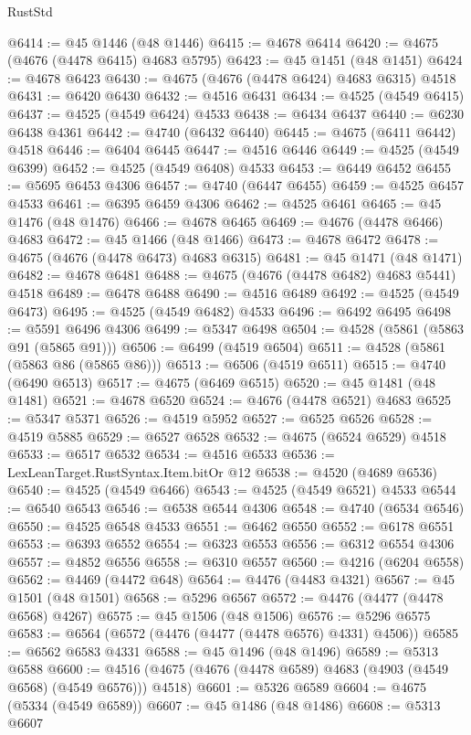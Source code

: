 \begin{lexlean}{RustStd}
\begin{coremodule}
@6414 := @45 @1446 (@48 @1446)
@6415 := @4678 @6414
@6420 := @4675 (@4676 (@4478 @6415) @4683 @5795)
@6423 := @45 @1451 (@48 @1451)
@6424 := @4678 @6423
@6430 := @4675 (@4676 (@4478 @6424) @4683 @6315) @4518
@6431 := @6420 @6430
@6432 := @4516 @6431
@6434 := @4525 (@4549 @6415)
@6437 := @4525 (@4549 @6424) @4533
@6438 := @6434 @6437
@6440 := @6230 @6438 @4361
@6442 := @4740 (@6432 @6440)
@6445 := @4675 (@6411 @6442) @4518
@6446 := @6404 @6445
@6447 := @4516 @6446
@6449 := @4525 (@4549 @6399)
@6452 := @4525 (@4549 @6408) @4533
@6453 := @6449 @6452
@6455 := @5695 @6453 @4306
@6457 := @4740 (@6447 @6455)
@6459 := @4525 @6457 @4533
@6461 := @6395 @6459 @4306
@6462 := @4525 @6461
@6465 := @45 @1476 (@48 @1476)
@6466 := @4678 @6465
@6469 := @4676 (@4478 @6466) @4683
@6472 := @45 @1466 (@48 @1466)
@6473 := @4678 @6472
@6478 := @4675 (@4676 (@4478 @6473) @4683 @6315)
@6481 := @45 @1471 (@48 @1471)
@6482 := @4678 @6481
@6488 := @4675 (@4676 (@4478 @6482) @4683 @5441) @4518
@6489 := @6478 @6488
@6490 := @4516 @6489
@6492 := @4525 (@4549 @6473)
@6495 := @4525 (@4549 @6482) @4533
@6496 := @6492 @6495
@6498 := @5591 @6496 @4306
@6499 := @5347 @6498
@6504 := @4528 (@5861 (@5863 @91 (@5865 @91)))
@6506 := @6499 (@4519 @6504)
@6511 := @4528 (@5861 (@5863 @86 (@5865 @86)))
@6513 := @6506 (@4519 @6511)
@6515 := @4740 (@6490 @6513)
@6517 := @4675 (@6469 @6515)
@6520 := @45 @1481 (@48 @1481)
@6521 := @4678 @6520
@6524 := @4676 (@4478 @6521) @4683
@6525 := @5347 @5371
@6526 := @4519 @5952
@6527 := @6525 @6526
@6528 := @4519 @5885
@6529 := @6527 @6528
@6532 := @4675 (@6524 @6529) @4518
@6533 := @6517 @6532
@6534 := @4516 @6533
@6536 := LexLeanTarget.RustSyntax.Item.bitOr @12
@6538 := @4520 (@4689 @6536)
@6540 := @4525 (@4549 @6466)
@6543 := @4525 (@4549 @6521) @4533
@6544 := @6540 @6543
@6546 := @6538 @6544 @4306
@6548 := @4740 (@6534 @6546)
@6550 := @4525 @6548 @4533
@6551 := @6462 @6550
@6552 := @6178 @6551
@6553 := @6393 @6552
@6554 := @6323 @6553
@6556 := @6312 @6554 @4306
@6557 := @4852 @6556
@6558 := @6310 @6557
@6560 := @4216 (@6204 @6558)
@6562 := @4469 (@4472 @648)
@6564 := @4476 (@4483 @4321)
@6567 := @45 @1501 (@48 @1501)
@6568 := @5296 @6567
@6572 := @4476 (@4477 (@4478 @6568) @4267)
@6575 := @45 @1506 (@48 @1506)
@6576 := @5296 @6575
@6583 := @6564 (@6572 (@4476 (@4477 (@4478 @6576) @4331) @4506))
@6585 := @6562 @6583 @4331
@6588 := @45 @1496 (@48 @1496)
@6589 := @5313 @6588
@6600 := @4516 (@4675 (@4676 (@4478 @6589) @4683 (@4903 (@4549 @6568) (@4549 @6576))) @4518)
@6601 := @5326 @6589
@6604 := @4675 (@5334 (@4549 @6589))
@6607 := @45 @1486 (@48 @1486)
@6608 := @5313 @6607

\end{coremodule}
\end{lexlean}
